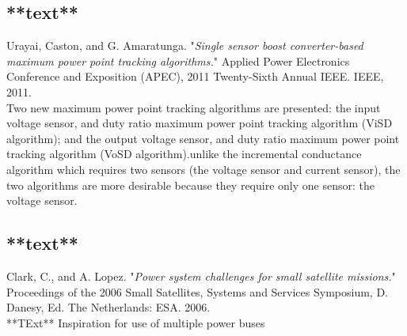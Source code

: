 \subsection{**text**\cite{urayai2011single}}
Urayai, Caston, and G. Amaratunga. "\textit{Single sensor boost converter-based maximum power point tracking algorithms.}" Applied Power Electronics Conference and Exposition (APEC), 2011 Twenty-Sixth Annual IEEE. IEEE, 2011.\\

Two new maximum power point tracking algorithms are presented: the input voltage sensor, and duty ratio maximum power point tracking algorithm (ViSD algorithm); and the output voltage sensor, and duty ratio maximum power point tracking algorithm (VoSD algorithm).unlike the incremental conductance algorithm which requires two sensors (the voltage sensor and current sensor), the two algorithms are more desirable because they require only one sensor: the voltage sensor.  \\ 

\subsection{**text**\cite{clark2006power}}

Clark, C., and A. Lopez. "\textit{Power system challenges for small satellite missions.}" Proceedings of the 2006 Small Satellites, Systems and Services Symposium, D. Danesy, Ed. The Netherlands: ESA. 2006.\\


**TExt**
Inspiration for use of multiple power buses 

